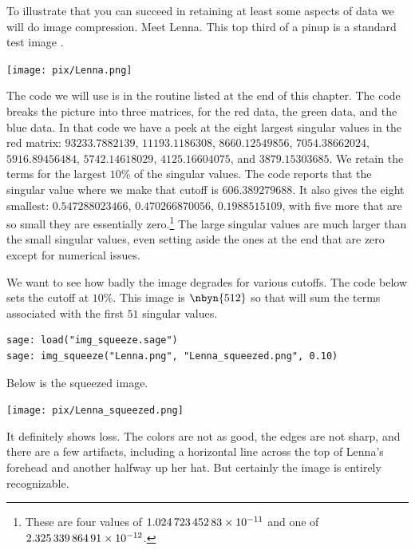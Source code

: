 To illustrate that you can succeed in retaining at least some aspects of data
we will do image compression.
Meet Lenna.
This top third of a pinup is a standard test image
\cite{wiki:Lenna}.
\begin{center}
  \texttt{[image: pix/Lenna.png]} %
\end{center}

The code we will use is in the  routine 
listed at the end of this chapter.
The code breaks the picture into three matrices, for the red data, the 
green data, and the blue data.
In that code we have a peek at the eight largest singular
values in the red matrix:
  $93233.7882139$, 
  $11193.1186308$, 
  $8660.12549856$, 
  $7054.38662024$, 
  $5916.89456484$, 
  $5742.14618029$, 
  $4125.16604075$, and
  $3879.15303685$.
We retain the terms for the largest $10\%$ of the singular values. 
The code reports that
the singular value where we make that cutoff is $606.389279688$.
It also gives the eight smallest:
  $0.547288023466$, 
  $0.470266870056$, 
  $0.1988515109$, 
with five more that are so small they are essentially 
zero.\footnote{These are four values of 
$1.024\,723\,452\,83\protect\times 10^{-11}$
and one of $2.325\,339\,864\,91\protect\times 10^{-12}$.}
The large singular values are much larger than the small singular values,
even setting aside the ones at the end
that are zero except for numerical issues.

We want to see how badly the image degrades for various cutoffs.
The code below sets the cutoff at $10$\%.
This image is $\nbyn{512}$ so that will sum the terms associated
with the first $51$ singular 
values.
\begin{lstlisting}
sage: load("img_squeeze.sage")                                 
sage: img_squeeze("Lenna.png", "Lenna_squeezed.png", 0.10)
\end{lstlisting}
Below is the squeezed image.
\begin{center}
  \texttt{[image: pix/Lenna\_squeezed.png]}
\end{center}
It definitely shows loss.
The colors are not as good, the edges are not sharp, and there are 
a few artifacts, including a horizontal line across the top of 
Lenna's forehead and another halfway up her hat.
But certainly the image is entirely recognizable.

